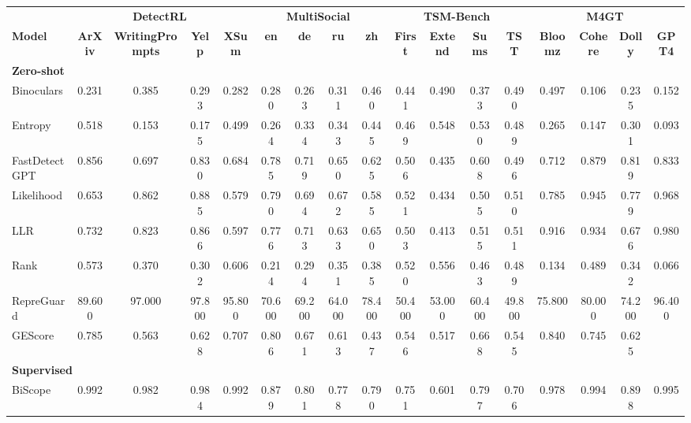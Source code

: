 \begin{tabular}{lcccccccccccccccc}
\toprule
& \multicolumn{4}{c}{\textbf{DetectRL~\citep{wu2024detectrl}}} & \multicolumn{4}{c}{\textbf{MultiSocial~\citep{macko2025multi}}} & \multicolumn{4}{c}{\textbf{TSM-Bench~\citep{quaremba2026tsm}}} & \multicolumn{4}{c}{\textbf{M4GT~\cite{wang2024m4gt}}} \\
\cmidrule(lr){2-5}\cmidrule(lr){6-9}\cmidrule(lr){10-13}\cmidrule(lr){14-17}
\textbf{Model} & \textbf{ArXiv} & \textbf{WritingPrompts} & \textbf{Yelp} & \textbf{XSum} & \textbf{en} & \textbf{de} & \textbf{ru} & \textbf{zh} & \textbf{First} & \textbf{Extend} & \textbf{Sums} & \textbf{TST} & \textbf{Bloomz} & \textbf{Cohere} & \textbf{Dolly} & \textbf{GPT4} \\
\midrule
\multicolumn{17}{l}{\textbf{Zero-shot}} \\
\midrule
Binoculars & 0.231 & 0.385 & 0.293 & 0.282 & 0.280 & 0.263 & 0.311 & 0.460 & 0.441 & 0.490 & 0.373 & 0.490 & 0.497 & 0.106 & 0.235 & 0.152 \\
Entropy & 0.518 & 0.153 & 0.175 & 0.499 & 0.264 & 0.334 & 0.343 & 0.445 & 0.469 & 0.548 & 0.530 & 0.489 & 0.265 & 0.147 & 0.301 & 0.093 \\
FastDetectGPT & 0.856 & 0.697 & 0.830 & 0.684 & 0.785 & 0.719 & 0.650 & 0.625 & 0.506 & 0.435 & 0.608 & 0.496 & 0.712 & 0.879 & 0.819 & 0.833 \\
Likelihood & 0.653 & 0.862 & 0.885 & 0.579 & 0.790 & 0.694 & 0.672 & 0.585 & 0.521 & 0.434 & 0.505 & 0.510 & 0.785 & 0.945 & 0.779 & 0.968 \\
LLR & 0.732 & 0.823 & 0.866 & 0.597 & 0.776 & 0.713 & 0.633 & 0.650 & 0.503 & 0.413 & 0.515 & 0.511 & 0.916 & 0.934 & 0.676 & 0.980 \\
Rank & 0.573 & 0.370 & 0.302 & 0.606 & 0.214 & 0.294 & 0.351 & 0.385 & 0.520 & 0.556 & 0.463 & 0.489 & 0.134 & 0.489 & 0.342 & 0.066 \\
RepreGuard & 89.600 & 97.000 & 97.800 & 95.800 & 70.600 & 69.200 & 64.000 & 78.400 & 50.400 & 53.000 & 60.400 & 49.800 & 75.800 & 80.000 & 74.200 & 96.400 \\
GEScore & 0.785 & 0.563 & 0.628 & 0.707 & 0.806 & 0.671 & 0.613 & 0.437 & 0.546 & 0.517 & 0.668 & 0.545 & 0.840 & 0.745 & 0.625 &  \\
\midrule
\multicolumn{17}{l}{\textbf{Supervised}} \\
\midrule
BiScope & 0.992 & 0.982 & 0.984 & 0.992 & 0.879 & 0.801 & 0.778 & 0.790 & 0.751 & 0.601 & 0.797 & 0.706 & 0.978 & 0.994 & 0.898 & 0.995 \\

\end{tabular}
